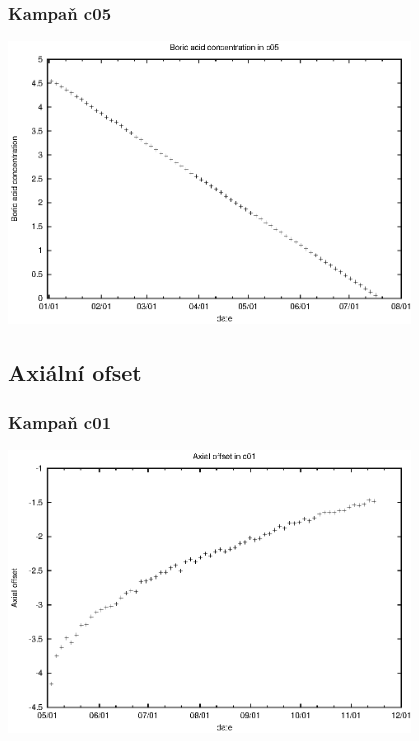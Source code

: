 \documentclass[a4paper,twoside,11pt]{article}
\begin{document}
\subsubsection{Kampaň c05}
\begin{center}
\includegraphics[width=0.8\textwidth]{bc_c05.eps}
\end{center}


\subsection{Axiální ofset}





\subsubsection{Kampaň c01}

\begin{center}
\includegraphics[width=0.8\textwidth]{ao_c01.eps}
\end{center}
\end{document}
